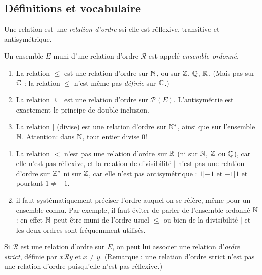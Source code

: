 \subsection{Définitions et vocabulaire}


\begin{definition}
Une relation est une \emph{relation d'ordre} ssi elle est réflexive, transitive et antisymétrique.

Un ensemble $E$ muni d'une relation d'ordre ${\mathcal R}$ est appelé \emph{ensemble ordonné}.
\end{definition}

\begin{exemples}
\begin{enumerate}[label=\alph*)]
\item La relation $\leq$ est une relation d'ordre sur $\mathbb{N}$, ou sur $\mathbb{Z}$, $\mathbb{Q}$, $\mathbb{R}$. (Mais pas sur $\mathbb{C}$ : la relation $\leq$ n'est même pas \emph{définie} sur $\mathbb{C}$.)
\item La relation $\subseteq$ est une relation d'ordre sur $\mathcal P(E)$. L'antisymétrie est exactement le principe de double inclusion.
\item La relation $|$ (\og divise\fg) est une relation d'ordre sur $\mathbb{N}^*$, ainsi que sur l'ensemble $\mathbb{N}$. Attention: dans $\mathbb{N}$, tout entier divise $0$! 
\end{enumerate}
\end{exemples}

\begin{attention}
\begin{enumerate}
\item La relation $<$ n'est pas une relation d'ordre sur $\mathbb{R}$ (ni sur $\mathbb{N}$, $\mathbb{Z}$ ou $\mathbb{Q}$), car elle n'est pas réflexive, et la relation de divisibilité $|$ n'est pas une relation d'ordre sur $\mathbb{Z}^*$ ni sur $\mathbb{Z}$, car elle n'est pas antisymétrique : $1|-1$ et $-1|1$ et pourtant $1\neq -1$.
\item il faut systématiquement préciser l'ordre auquel on se réfère, même pour un ensemble \og connu\fg. Par exemple, il faut éviter de parler de \og l'ensemble ordonné $\mathbb{N}$\fg: en effet $\mathbb{N}$ peut être muni de l'ordre usuel $\leq$ ou bien de la divisibilité $|$ et les deux ordres sont fréquemment utilisés.
\end{enumerate}
\end{attention}


\begin{definition}
Si ${\mathcal R}$ est une relation d'ordre sur $E$, on peut lui associer une relation d'\emph{ordre strict}, définie par \og$ x{\mathcal R}y\text{ et }x\neq y$\fg. (Remarque : une relation d'ordre strict n'est pas une relation d'ordre puisqu'elle n'est pas réflexive.)
\end{definition}

